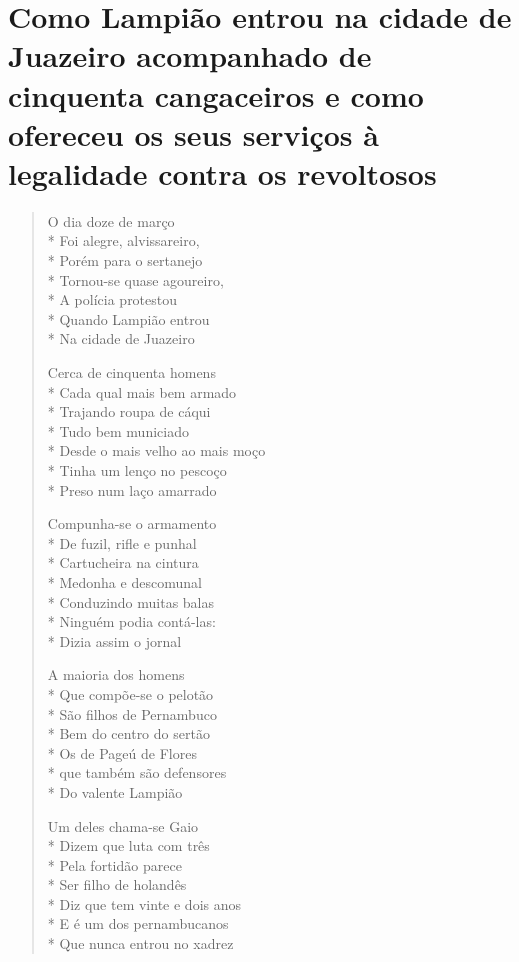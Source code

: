 \cleardoublepage


\chapter[Como Lampião entrou na cidade
de Juazeiro]{Como Lampião entrou na cidade
de Juazeiro acompanhado de
cinquenta cangaceiros e como
ofereceu os seus serviços à
legalidade contra os revoltosos}

\begin{verse}

O dia doze de março\\*
Foi alegre, alvissareiro,\\*
Porém para o sertanejo\\*
Tornou-se quase agoureiro,\\*
A polícia protestou\\*
Quando Lampião entrou\\*
Na cidade de Juazeiro

Cerca de cinquenta homens\\*
Cada qual mais bem armado\\*
Trajando roupa de cáqui\\*
Tudo bem municiado\\*
Desde o mais velho ao mais moço\\*
Tinha um lenço no pescoço\\*
Preso num laço amarrado

Compunha-se o armamento\\*
De fuzil, rifle e punhal\\*
Cartucheira na cintura\\*
Medonha e descomunal\\*
Conduzindo muitas balas\\*
Ninguém podia contá-las:\\*
Dizia assim o jornal

A maioria dos homens\\*
Que compõe-se o pelotão\\*
São filhos de Pernambuco\\*
Bem do centro do sertão\\*
Os de Pageú de Flores\\*
que também são defensores\\*
Do valente Lampião

Um deles chama-se Gaio\\*
Dizem que luta com três\\*
Pela fortidão parece\\*
Ser filho de holandês\\*
Diz que tem vinte e dois anos\\*
E é um dos pernambucanos\\*
Que nunca entrou no xadrez


\end{verse}
